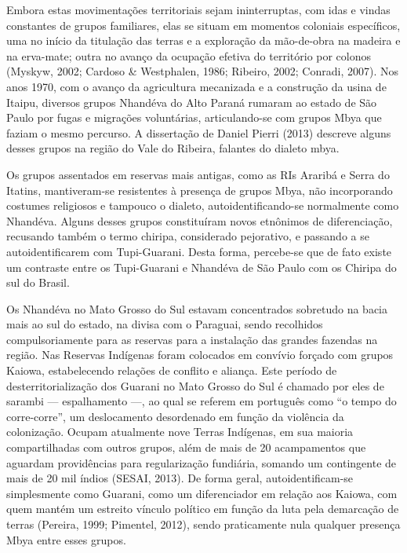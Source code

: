 \documentclass{article}
\begin{document}
Embora estas movimenta\c{c}\~oes territoriais sejam ininterruptas, com
idas e vindas constantes de grupos familiares, elas se situam em
momentos coloniais espec\'ificos, uma no in\'icio da titula\c{c}\~ao
das terras e a explora\c{c}\~ao da m\~ao-de-obra na madeira e na
erva-mate; outra no avan\c{c}o da ocupa\c{c}\~ao efetiva do
territ\'orio por colonos (Myskyw, 2002; Cardoso \& Westphalen, 1986;
Ribeiro, 2002; Conradi, 2007). Nos anos 1970, com o avan\c{c}o da
agricultura mecanizada e a constru\c{c}\~ao da usina de Itaipu,
diversos grupos Nhand\'eva do Alto Paran\'a rumaram ao estado de S\~ao
Paulo por fugas e migra\c{c}\~oes volunt\'arias, articulando-se com
grupos Mbya que faziam o mesmo percurso. A disserta\c{c}\~ao de Daniel
Pierri (2013) descreve alguns desses grupos na regi\~ao do Vale do
Ribeira, falantes do dialeto mbya.

Os grupos assentados em reservas mais antigas, como as RIs Ararib\'a e
Serra do Itatins, mantiveram-se resistentes \`a presen\c{c}a de grupos
Mbya, n\~ao incorporando costumes religiosos e tampouco o dialeto,
autoidentificando-se normalmente como Nhand\'eva. Alguns desses grupos
constitu\'iram novos etn\^onimos de diferencia\c{c}\~ao, recusando
tamb\'em o termo chiripa, considerado pejorativo, e passando a se
autoidentificarem com Tupi-Guarani. Desta forma, percebe-se que de fato
existe um contraste entre os Tupi-Guarani e Nhand\'eva de S\~ao Paulo
com os Chiripa do sul do Brasil.

Os Nhand\'eva no Mato Grosso do Sul estavam concentrados sobretudo na
bacia mais ao sul do estado, na divisa com o Paraguai, sendo recolhidos
compulsoriamente para as reservas para a instala\c{c}\~ao das grandes
fazendas na regi\~ao. Nas Reservas Ind\'igenas foram colocados em
conv\'ivio for\c{c}ado com grupos Kaiowa, estabelecendo rela\c{c}\~oes
de conflito e alian\c{c}a.  Este per\'iodo de
desterritorializa\c{c}\~ao dos Guarani no Mato Grosso do Sul \'e
chamado por eles de sarambi {}--- espalhamento ---, ao qual se referem
em portugu\^es como {\textquotedblleft}o tempo do
corre-corre{\textquotedblright}, um deslocamento desordenado em
fun\c{c}\~ao da viol\^encia da coloniza\c{c}\~ao. Ocupam atualmente
nove Terras Ind\'igenas, em sua maioria compartilhadas com outros
grupos, al\'em de mais de 20 acampamentos que aguardam provid\^encias
para regulariza\c{c}\~ao fundi\'aria, somando um contingente de mais de
20 mil \'indios (SESAI, 2013). De forma geral, autoidentificam-se
simplesmente como Guarani, como um diferenciador em rela\c{c}\~ao aos
Kaiowa, com quem mant\'em um estreito v\'inculo pol\'itico em
fun\c{c}\~ao da luta pela demarca\c{c}\~ao de terras (Pereira, 1999;
Pimentel, 2012), sendo praticamente nula qualquer presen\c{c}a Mbya
entre esses grupos.
\end{document}
